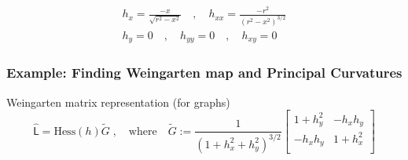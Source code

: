 \documentclass[9pt]{beamer}
\newcommand{\Hess}{\mathrm{Hess}} %
\newcommand{\weinmat}{\widehat{\mathsf{L}}}
\begin{document}
\begin{frame}
\begin{gather*}
h_x = \frac{-x}{\sqrt{r^2 - x^2}}
\quad , \quad
h_{xx} = \frac{-r^2}{\left(r^2 - x^2\right)^{3/2}}\\
h_y = 0
\quad , \quad
h_{yy} = 0 \quad,\quad h_{xy} = 0
\end{gather*}
\end{frame}

\begin{frame}
\frametitle{Example: Finding Weingarten map and Principal Curvatures}
\begin{block}{Weingarten matrix representation (for graphs)}
\begin{equation*}
\weinmat = \Hess(h) \tilde{G} \;,\quad \mathrm{where} \quad
\tilde{G} := \frac{1}{\left({1+h_x^2 + h_y^2}\right)^{3/2}}
\begin{bmatrix}
1 + h_y^2 & -h_x h_y \\
-h_x h_y & 1 + h_x^2 \\
\end{bmatrix} 
\end{equation*}
\end{block}


\end{frame}
\end{document}
